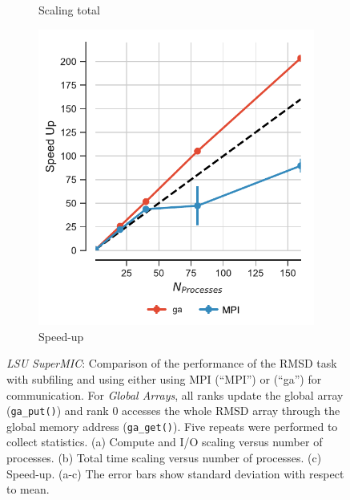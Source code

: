 \begin{figure}[!htb]
\begin{subfigure}{.3\textwidth}
    \caption{Scaling total}
    \label{fig:MPItottime-SuperMIC}
  \end{subfigure}
  \hfill
  \begin{subfigure}{.3\textwidth}
    \includegraphics[width=\linewidth]{figures/Comparison_Speed_UP_traj_splitting-SuperMIC_edited.pdf}
    \caption{Speed-up}
    \label{fig:MPIspeedup-SuperMIC}
  \end{subfigure}

  \caption{\emph{LSU SuperMIC}: Comparison of the performance of the RMSD task with subfiling and using either using MPI  (``MPI'') or  (``ga'') for communication.
    For \emph{Global Arrays}, all ranks update the global array (\texttt{ga\_put()}) and rank 0 accesses the whole RMSD array through the global memory address (\texttt{ga\_get()}).
    Five repeats were performed to collect statistics.
    (a) Compute and I/O scaling versus number of processes.
    (b) Total time scaling versus number of processes.
    (c) Speed-up.
    (a-c) The error bars show standard deviation with respect to mean.}
  \label{fig:MPIwithIO-split-SuperMIC}
\end{figure}

